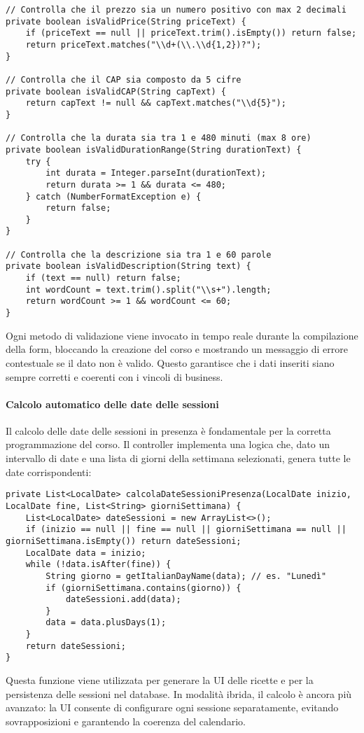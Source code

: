 \begin{verbatim}
// Controlla che il prezzo sia un numero positivo con max 2 decimali
private boolean isValidPrice(String priceText) {
    if (priceText == null || priceText.trim().isEmpty()) return false;
    return priceText.matches("\\d+(\\.\\d{1,2})?");
}

// Controlla che il CAP sia composto da 5 cifre
private boolean isValidCAP(String capText) {
    return capText != null && capText.matches("\\d{5}");
}

// Controlla che la durata sia tra 1 e 480 minuti (max 8 ore)
private boolean isValidDurationRange(String durationText) {
    try {
        int durata = Integer.parseInt(durationText);
        return durata >= 1 && durata <= 480;
    } catch (NumberFormatException e) {
        return false;
    }
}

// Controlla che la descrizione sia tra 1 e 60 parole
private boolean isValidDescription(String text) {
    if (text == null) return false;
    int wordCount = text.trim().split("\\s+").length;
    return wordCount >= 1 && wordCount <= 60;
}
\end{verbatim}
Ogni metodo di validazione viene invocato in tempo reale durante la compilazione della form, bloccando la creazione del corso e mostrando un messaggio di errore contestuale se il dato non è valido. Questo garantisce che i dati inseriti siano sempre corretti e coerenti con i vincoli di business.

\paragraph{Calcolo automatico delle date delle sessioni}
Il calcolo delle date delle sessioni in presenza è fondamentale per la corretta programmazione del corso. Il controller implementa una logica che, dato un intervallo di date e una lista di giorni della settimana selezionati, genera tutte le date corrispondenti:
\begin{verbatim}
private List<LocalDate> calcolaDateSessioniPresenza(LocalDate inizio, LocalDate fine, List<String> giorniSettimana) {
    List<LocalDate> dateSessioni = new ArrayList<>();
    if (inizio == null || fine == null || giorniSettimana == null || giorniSettimana.isEmpty()) return dateSessioni;
    LocalDate data = inizio;
    while (!data.isAfter(fine)) {
        String giorno = getItalianDayName(data); // es. "Lunedì"
        if (giorniSettimana.contains(giorno)) {
            dateSessioni.add(data);
        }
        data = data.plusDays(1);
    }
    return dateSessioni;
}
\end{verbatim}
Questa funzione viene utilizzata per generare la UI delle ricette e per la persistenza delle sessioni nel database. In modalità ibrida, il calcolo è ancora più avanzato: la UI consente di configurare ogni sessione separatamente, evitando sovrapposizioni e garantendo la coerenza del calendario.

